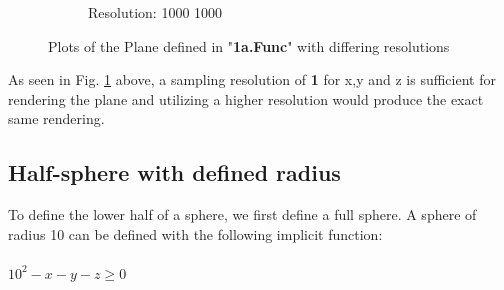 \documentclass[acmlarge,nonacm=true]{acmart}
\begin{document}
\begin{figure}[H]
\begin{subfigure}{.33\textwidth}
		\caption{Resolution: 1000 1000}
	  \end{subfigure}
	\caption{Plots of the Plane defined in "\textbf{1a.Func}" with differing resolutions}
	\label{fig:1a}
\end{figure}
As seen in Fig. \ref{fig:1a} above, a sampling resolution of \textbf{1} for x,y and z is 
sufficient for rendering the plane and utilizing a higher resolution would
produce the exact same rendering.

\subsection{Half-sphere with defined radius}
To define the lower half of a sphere, we first define a full sphere.
A sphere of radius 10 can be defined with the following implicit function:\\\\
$10^2 - x - y - z \geq 0$\\\\
\end{document}
